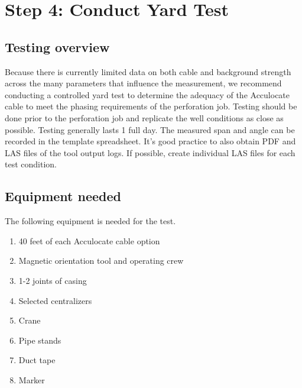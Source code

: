 \documentclass[paper=a4, fontsize=11pt]{scrartcl}
\numberwithin{equation}{section}		%
\numberwithin{figure}{section}			%
\numberwithin{table}{section}				%
\begin{document}
\section{Step 4: Conduct Yard Test}

\subsection{Testing overview}
Because there is currently limited data on both cable and background strength across the many parameters that influence the measurement, we recommend conducting a controlled yard test to determine the adequacy of the Acculocate cable to meet the phasing requirements of the perforation job.  Testing should be done prior to the perforation job and replicate the well conditions as close as possible.  Testing generally lasts 1 full day.  The measured span and angle can be recorded in the template spreadsheet.  It's good practice to also obtain PDF and LAS files of the tool output logs.  If possible, create individual LAS files for each test condition.  

\subsection{Equipment needed}
The following equipment is needed for the test.  

\begin{enumerate}
    \item 40 feet of each Acculocate cable option
    \item Magnetic orientation tool and operating crew
    \item 1-2 joints of casing
    \item Selected centralizers
    \item Crane
    \item Pipe stands
    \item Duct tape
    \item Marker
\end{enumerate}
\end{document}
